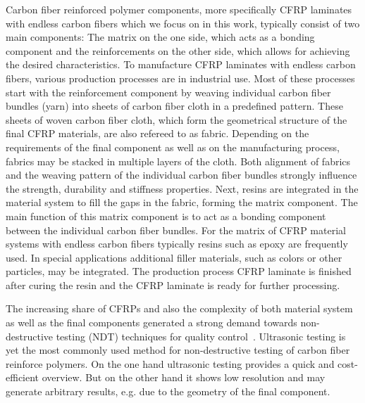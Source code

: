 Carbon fiber reinforced polymer components, more specifically CFRP laminates with endless carbon fibers which we focus on in this work, typically consist of two main components: 
The matrix on the one side, which acts as a bonding component and the reinforcements on the other side, which allows for achieving the desired characteristics. To manufacture CFRP laminates with endless carbon fibers, various production processes are in industrial use. Most of these processes start with the reinforcement component by weaving individual carbon fiber bundles (yarn) into sheets of carbon fiber cloth in a predefined pattern. These sheets of woven carbon fiber cloth, which form the geometrical structure of the final CFRP materials, are also refereed to as fabric. Depending on the requirements of the final component as well as on the manufacturing process, fabrics may be stacked in multiple layers of the cloth. Both alignment of fabrics and the weaving pattern of the individual carbon fiber bundles strongly influence the strength, durability and stiffness properties. Next, resins are integrated in the material system to fill the gaps in the fabric, forming the matrix component. The main function of this matrix component is to act as a bonding component between the individual carbon fiber bundles. For the matrix of CFRP material systems with endless carbon fibers typically resins such as epoxy are frequently used. In special applications additional filler materials, such as colors or other particles, may be integrated. The production process CFRP laminate is finished after curing the resin and the CFRP laminate is ready for further processing. 

The increasing share of CFRPs and also the complexity of both material system as well as the final components generated a strong demand towards non-destructive testing (NDT) techniques for quality control~\cite{Red2012}. Ultrasonic testing is yet the most commonly used method for non-destructive testing of carbon fiber reinforce polymers. On the one hand ultrasonic testing provides a quick and cost-efficient overview. But on the other hand it shows low resolution and may generate arbitrary results, e.g. due to the geometry of the final component. 

